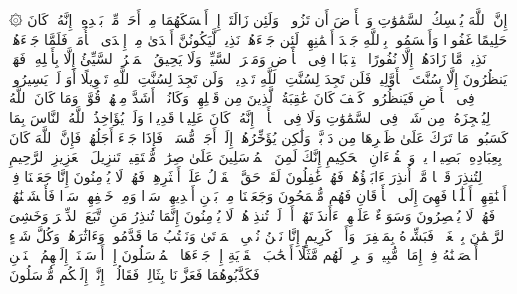\startbuffer[\q:35:41]
۞ إِنَّ ٱللَّهَ یُمۡسِكُ ٱلسَّمَٰوَٰتِ وَٱلۡأَرۡضَ أَن تَزُولَاۚ وَلَئِن زَالَتَاۤ إِنۡ أَمۡسَكَهُمَا مِنۡ أَحَدࣲ مِّنۢ بَعۡدِهِۦۤۚ إِنَّهُۥ كَانَ حَلِیمًا غَفُورࣰا%
\stopbuffer%
\startbuffer[\q:35:42]
وَأَقۡسَمُوا۟ بِٱللَّهِ جَهۡدَ أَیۡمَٰنِهِمۡ لَئِن جَاۤءَهُمۡ نَذِیرࣱ لَّیَكُونُنَّ أَهۡدَىٰ مِنۡ إِحۡدَى ٱلۡأُمَمِۖ فَلَمَّا جَاۤءَهُمۡ نَذِیرࣱ مَّا زَادَهُمۡ إِلَّا نُفُورًا%
\stopbuffer%
\startbuffer[\q:35:43]
ٱسۡتِكۡبَارࣰا فِی ٱلۡأَرۡضِ وَمَكۡرَ ٱلسَّیِّئِۚ وَلَا یَحِیقُ ٱلۡمَكۡرُ ٱلسَّیِّئُ إِلَّا بِأَهۡلِهِۦۚ فَهَلۡ یَنظُرُونَ إِلَّا سُنَّتَ ٱلۡأَوَّلِینَۚ فَلَن تَجِدَ لِسُنَّتِ ٱللَّهِ تَبۡدِیلࣰاۖ وَلَن تَجِدَ لِسُنَّتِ ٱللَّهِ تَحۡوِیلًا%
\stopbuffer%
\startbuffer[\q:35:44]
أَوَ لَمۡ یَسِیرُوا۟ فِی ٱلۡأَرۡضِ فَیَنظُرُوا۟ كَیۡفَ كَانَ عَٰقِبَةُ ٱلَّذِینَ مِن قَبۡلِهِمۡ وَكَانُوۤا۟ أَشَدَّ مِنۡهُمۡ قُوَّةࣰۚ وَمَا كَانَ ٱللَّهُ لِیُعۡجِزَهُۥ مِن شَیۡءࣲ فِی ٱلسَّمَٰوَٰتِ وَلَا فِی ٱلۡأَرۡضِۚ إِنَّهُۥ كَانَ عَلِیمࣰا قَدِیرࣰا%
\stopbuffer%
\startbuffer[\q:35:45]
وَلَوۡ یُؤَاخِذُ ٱللَّهُ ٱلنَّاسَ بِمَا كَسَبُوا۟ مَا تَرَكَ عَلَىٰ ظَهۡرِهَا مِن دَاۤبَّةࣲ وَلَٰكِن یُؤَخِّرُهُمۡ إِلَىٰۤ أَجَلࣲ مُّسَمࣰّىۖ فَإِذَا جَاۤءَ أَجَلُهُمۡ فَإِنَّ ٱللَّهَ كَانَ بِعِبَادِهِۦ بَصِیرَۢا%
\stopbuffer%
\startbuffer[\q:36:1]
یسۤ%
\stopbuffer%
\startbuffer[\q:36:2]
وَٱلۡقُرۡءَانِ ٱلۡحَكِیمِ%
\stopbuffer%
\startbuffer[\q:36:3]
إِنَّكَ لَمِنَ ٱلۡمُرۡسَلِینَ%
\stopbuffer%
\startbuffer[\q:36:4]
عَلَىٰ صِرَٰطࣲ مُّسۡتَقِیمࣲ%
\stopbuffer%
\startbuffer[\q:36:5]
تَنزِیلَ ٱلۡعَزِیزِ ٱلرَّحِیمِ%
\stopbuffer%
\startbuffer[\q:36:6]
لِتُنذِرَ قَوۡمࣰا مَّاۤ أُنذِرَ ءَابَاۤؤُهُمۡ فَهُمۡ غَٰفِلُونَ%
\stopbuffer%
\startbuffer[\q:36:7]
لَقَدۡ حَقَّ ٱلۡقَوۡلُ عَلَىٰۤ أَكۡثَرِهِمۡ فَهُمۡ لَا یُؤۡمِنُونَ%
\stopbuffer%
\startbuffer[\q:36:8]
إِنَّا جَعَلۡنَا فِیۤ أَعۡنَٰقِهِمۡ أَغۡلَٰلࣰا فَهِیَ إِلَى ٱلۡأَذۡقَانِ فَهُم مُّقۡمَحُونَ%
\stopbuffer%
\startbuffer[\q:36:9]
وَجَعَلۡنَا مِنۢ بَیۡنِ أَیۡدِیهِمۡ سَدࣰّا وَمِنۡ خَلۡفِهِمۡ سَدࣰّا فَأَغۡشَیۡنَٰهُمۡ فَهُمۡ لَا یُبۡصِرُونَ%
\stopbuffer%
\startbuffer[\q:36:10]
وَسَوَاۤءٌ عَلَیۡهِمۡ ءَأَنذَرۡتَهُمۡ أَمۡ لَمۡ تُنذِرۡهُمۡ لَا یُؤۡمِنُونَ%
\stopbuffer%
\startbuffer[\q:36:11]
إِنَّمَا تُنذِرُ مَنِ ٱتَّبَعَ ٱلذِّكۡرَ وَخَشِیَ ٱلرَّحۡمَٰنَ بِٱلۡغَیۡبِۖ فَبَشِّرۡهُ بِمَغۡفِرَةࣲ وَأَجۡرࣲ كَرِیمٍ%
\stopbuffer%
\startbuffer[\q:36:12]
إِنَّا نَحۡنُ نُحۡیِ ٱلۡمَوۡتَىٰ وَنَكۡتُبُ مَا قَدَّمُوا۟ وَءَاثَٰرَهُمۡۚ وَكُلَّ شَیۡءٍ أَحۡصَیۡنَٰهُ فِیۤ إِمَامࣲ مُّبِینࣲ%
\stopbuffer%
\startbuffer[\q:36:13]
وَٱضۡرِبۡ لَهُم مَّثَلًا أَصۡحَٰبَ ٱلۡقَرۡیَةِ إِذۡ جَاۤءَهَا ٱلۡمُرۡسَلُونَ%
\stopbuffer%
\startbuffer[\q:36:14]
إِذۡ أَرۡسَلۡنَاۤ إِلَیۡهِمُ ٱثۡنَیۡنِ فَكَذَّبُوهُمَا فَعَزَّزۡنَا بِثَالِثࣲ فَقَالُوۤا۟ إِنَّاۤ إِلَیۡكُم مُّرۡسَلُونَ%
